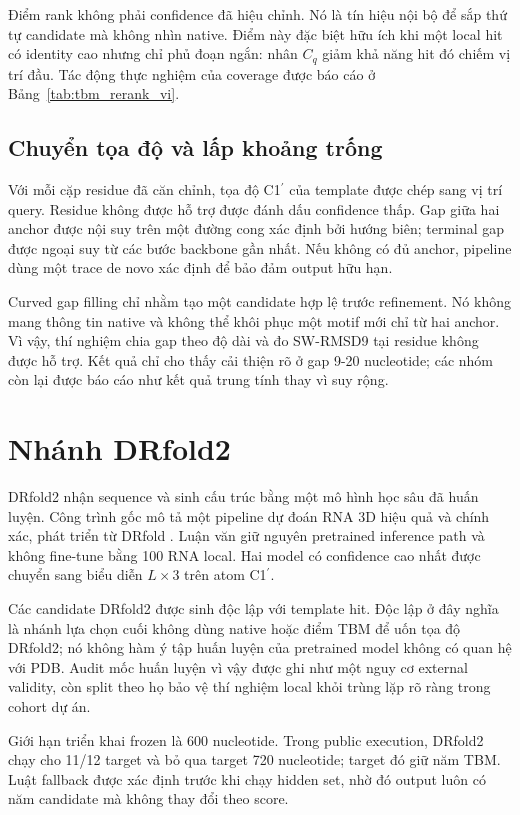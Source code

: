 \documentclass[12pt,a4paper,oneside]{report}
\newcommand{\cprime}{C1$^{\prime}$}
\begin{document}
Điểm rank không phải confidence đã hiệu chỉnh. Nó là tín hiệu nội bộ để sắp thứ tự
candidate mà không nhìn native. Điểm này đặc biệt hữu ích khi một local hit có identity
cao nhưng chỉ phủ đoạn ngắn: nhân $C_q$ giảm khả năng hit đó chiếm vị trí đầu. Tác động
thực nghiệm của coverage được báo cáo ở Bảng~\ref{tab:tbm_rerank_vi}.

\subsection{Chuyển tọa độ và lấp khoảng trống}

Với mỗi cặp residue đã căn chỉnh, tọa độ \cprime{} của template được chép sang vị trí
query. Residue không được hỗ trợ được đánh dấu confidence thấp. Gap giữa hai anchor được
nội suy trên một đường cong xác định bởi hướng biên; terminal gap được ngoại suy từ các
bước backbone gần nhất. Nếu không có đủ anchor, pipeline dùng một trace de novo xác
định để bảo đảm output hữu hạn.

Curved gap filling chỉ nhằm tạo một candidate hợp lệ trước refinement. Nó không mang
thông tin native và không thể khôi phục một motif mới chỉ từ hai anchor. Vì vậy, thí
nghiệm chia gap theo độ dài và đo SW-RMSD9 tại residue không được hỗ trợ. Kết quả chỉ cho
thấy cải thiện rõ ở gap 9-20 nucleotide; các nhóm còn lại được báo cáo như kết quả trung
tính thay vì suy rộng.

\section{Nhánh DRfold2}

DRfold2 nhận sequence và sinh cấu trúc bằng một mô hình học sâu đã huấn luyện. Công
trình gốc mô tả một pipeline dự đoán RNA 3D hiệu quả và chính xác, phát triển từ DRfold
\cite{drfold,drfold2}. Luận văn giữ nguyên pretrained inference path và không fine-tune
bằng 100 RNA local. Hai model có confidence cao nhất được chuyển sang biểu diễn
$L\times3$ trên atom \cprime{}.

Các candidate DRfold2 được sinh độc lập với template hit. Độc lập ở đây nghĩa là nhánh
lựa chọn cuối không dùng native hoặc điểm TBM để uốn tọa độ DRfold2; nó không hàm ý tập
huấn luyện của pretrained model không có quan hệ với PDB. Audit mốc huấn luyện vì vậy
được ghi như một nguy cơ external validity, còn split theo họ bảo vệ thí nghiệm local
khỏi trùng lặp rõ ràng trong cohort dự án.

Giới hạn triển khai frozen là 600 nucleotide. Trong public execution, DRfold2 chạy cho
11/12 target và bỏ qua target 720 nucleotide; target đó giữ năm TBM. Luật fallback được
xác định trước khi chạy hidden set, nhờ đó output luôn có năm candidate mà không thay đổi
theo score.
\end{document}

